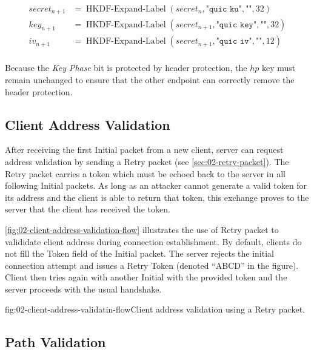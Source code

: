 \begin{equation*}
  \begin{split}
  secret_{n+1} & = \operatorname{HKDF-Expand-Label}(secret_{n}, \texttt{"quic ku"}, \texttt{""}, 32) \\
  key_{n+1} & = \operatorname{HKDF-Expand-Label}(secret_{n+1}, \texttt{"quic key"}, \texttt{""}, 32) \\
  iv_{n+1}  & = \operatorname{HKDF-Expand-Label}(secret_{n+1}, \texttt{"quic iv"}, \texttt{""}, 12)  \\
  \end{split}
\end{equation*}

Because the \textit{Key Phase} bit is protected by header protection, the $hp$ key must remain
unchanged to ensure that the other endpoint can correctly remove the header protection.

\subsection{Client Address Validation}\label{sec:02-address-validation}

After receiving the first Initial packet from a new client, server can request address validation by
sending a Retry packet (see \autoref{sec:02-retry-packet}). The Retry packet carries a token which
must be echoed back to the server in all following Initial packets. As long as an attacker cannot
generate a valid token for its address and the client is able to return that token, this exchange
proves to the server that the client has received the token.

\autoref{fig:02-client-address-validation-flow} illustrates the use of Retry packet to valididate
client address during connection establishment. By default, clients do not fill the Token field of
the Initial packet. The server rejects the initial connection attempt and issues a Retry Token
(denoted ``ABCD'' in the figure). Client then tries again with another Initial with the provided
token and the server proceeds with the usual handshake.

\begin{myFigure}{fig:02-client-address-validatin-flow}{Client address validation using a Retry packet.}

\resizebox{\linewidth}{!}{}

\end{myFigure}

\subsection{Path Validation}\label{sec:02-path-validation}

